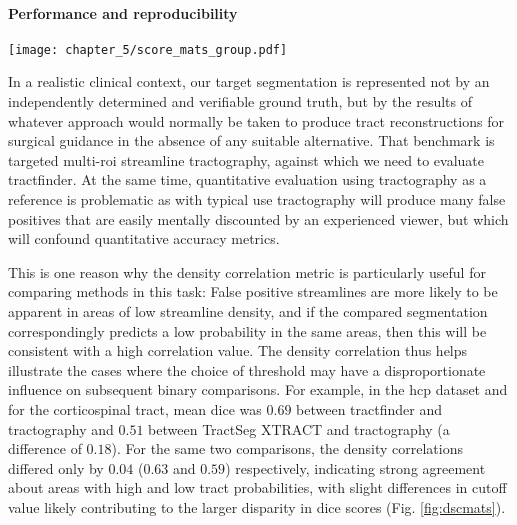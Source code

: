 \paragraph*{Performance and reproducibility}

\begin{SCfigure}
  \texttt{[image: chapter\_5/score\_mats\_group.pdf]}
  \caption{Pairwise \gls{dice} and density correlations for the \textit{Tractoinferno} (top) HCP49 (middle) and clinical (bottom) datasets. For each pair of methods, the metric distributions across all subjects are shown for each tract (from left to right: \gls{af}, \gls{cst}, \gls{ifof}, \gls{or}), with background colours corresponding to mean score value. 
  \label{fig:dscmats}}
\end{SCfigure}

In a realistic clinical context, our target segmentation is represented not by an independently determined and verifiable ground truth, but by the results of whatever approach would normally be taken to produce tract reconstructions for surgical guidance in the absence of any suitable alternative.
That benchmark is targeted multi-\gls{roi} streamline tractography, against which we need to evaluate tractfinder.
At the same time, quantitative evaluation using tractography as a reference is problematic as with typical use tractography will produce many false positives that are easily mentally discounted by an experienced viewer, but which will confound quantitative accuracy metrics.


This is one reason why the density correlation metric is particularly useful for comparing methods in this task:
False positive streamlines are more likely to be apparent in areas of low streamline density, and if the compared segmentation correspondingly predicts a low probability in the same areas, then this will be consistent with a high correlation value.
The density correlation thus helps illustrate the cases where the choice of threshold may have a disproportionate influence on subsequent binary comparisons.
For example, in the \gls{hcp} dataset and for the corticospinal tract, mean \gls{dice} was $0.69$ between tractfinder and tractography and $0.51$ between TractSeg XTRACT and tractography (a difference of $0.18$).
For the same two comparisons, the density correlations differed only by $0.04$ ($0.63$ and $0.59$) respectively, indicating strong agreement about areas with high and low tract probabilities, with slight differences in cutoff value likely contributing to the larger disparity in \gls{dice} scores (Fig. \ref{fig:dscmats}).


